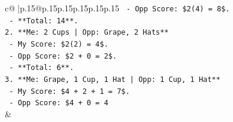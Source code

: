 \documentclass{article}
\begin{document}
{\begin{supertabular}{c@{$\;$}|p{.15\linewidth}@{}p{.15\linewidth}p{.15\linewidth}p{.15\linewidth}p{.15\linewidth}p{.15\linewidth}}
{{{\texttt{   {-} Opp Score: \$2(4) = 8\$.} \\
\texttt{   {-} **Total: 14**.} \\
\texttt{2. **Me: 2 Cups | Opp: Grape, 2 Hats**} \\
\texttt{   {-} My Score: \$2(2) = 4\$.} \\
\texttt{   {-} Opp Score: \$2 + 0 = 2\$.} \\
\texttt{   {-} **Total: 6**.} \\
\texttt{3. **Me: Grape, 1 Cup, 1 Hat | Opp: 1 Cup, 1 Hat**} \\
\texttt{   {-} My Score: \$4 + 2 + 1 = 7\$.} \\
\texttt{   {-} Opp Score: \$4 + 0 = 4} \\
            }
        }
    }
    & \\ \\


\end{supertabular}}
\end{document}
